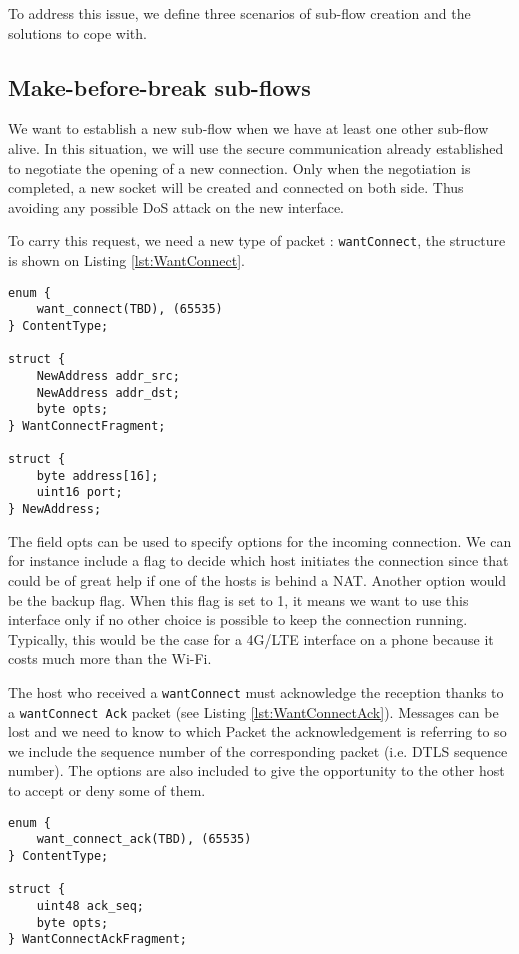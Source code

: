 To address this issue, we define three scenarios of sub-flow creation and the solutions to cope with.

\subsection{Make-before-break sub-flows}

We want to establish a new sub-flow when we have at least one other sub-flow alive. In this situation, we will use the secure communication already established to negotiate the opening of a new connection. Only when the negotiation is completed, a new socket will be created and connected on both side. Thus avoiding any possible DoS attack on the new interface.

To carry this request, we need a new type of packet : \texttt{wantConnect}, the structure is shown on Listing \ref{lst:WantConnect}.

\begin{lstlisting}[caption= WantConnect message, label=lst:WantConnect]
enum {
    want_connect(TBD), (65535)
} ContentType;

struct {
    NewAddress addr_src;
    NewAddress addr_dst;
    byte opts;
} WantConnectFragment;

struct {
    byte address[16];
    uint16 port;
} NewAddress;
\end{lstlisting}

The field opts can be used to specify options for the incoming connection.  We can for instance include a flag to decide which host initiates the connection since that could be of great help if one of the hosts is behind a NAT. Another option would be the backup flag. When this flag is set to 1, it means we want to use this interface only if no other choice is possible to keep the connection running. Typically, this would be the case for a 4G/LTE interface on a phone because it costs much more than the Wi-Fi.

The host who received a \texttt{wantConnect} must acknowledge the reception thanks to a \texttt{wantConnect Ack} packet (see Listing \ref{lst:WantConnectAck}). Messages can be lost and we need to know to which Packet the acknowledgement is referring to so we include the sequence number of the corresponding packet (i.e. DTLS sequence number). The options are also included to give the opportunity to the other host to accept or deny some of them.

\begin{lstlisting}[caption= wantConnectAck message, label=lst:WantConnectAck]
enum {
    want_connect_ack(TBD), (65535)
} ContentType;

struct {
    uint48 ack_seq;
    byte opts;
} WantConnectAckFragment;
\end{lstlisting}

